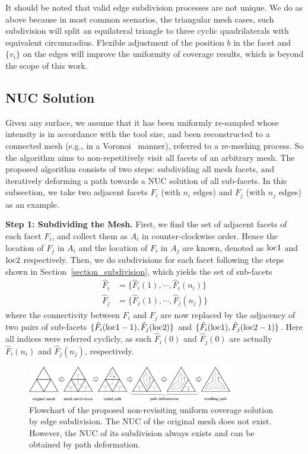 \documentclass[lettersize,journal]{IEEEtran}
\begin{document}
It should be noted that valid edge subdivision processes are not unique. 
We do as above because in most common scenarios, the triangular mesh cases, such subdivision will split an equilateral triangle to three cyclic quadrilaterals with equivalent circumradius. 
Flexible adjustment of the position $b$ in the facet and $\{v_i\}$ on the edges will improve the uniformity of coverage results, which is beyond the scope of this work. 

\subsection{NUC Solution}
Given any surface, we assume that it has been uniformly re-sampled whose intensity is in accordance with the tool size, and been reconstructed to a connected mesh (e.g., in a Voronoi~\cite{choset2000sensor-based} manner), referred to a re-meshing process. 
So the algorithm aims to non-repetitively visit all facets of an arbitrary mesh. 
The proposed algorithm consists of two steps: subdividing all mesh facets, and iteratively deforming a path towards a NUC solution of all sub-facets.
In this subsection, we take two adjacent facets $F_i$ (with $n_i$ edges) and $F_j$ (with $n_j$ edges) as an example. 

\textbf{Step 1: Subdividing the Mesh. }
First, we find the set of adjacent facets of each facet $F_i$, and collect them as $A_i$ in counter-clockwise order. 
Hence the location of $F_j$ in $A_i$ and the location of $F_i$ in $A_j$ are known, denoted as ${\rm loc1}$ and ${\rm loc2}$ respectively. 
Then, we do subdivisions for each facet following the steps shown in Section~\ref{section_subdivision}, which yields the set of sub-facets
\begin{equation}
\begin{aligned}
\hat{F}_i &= \{\hat{F}_i(1), \cdots, \hat{F}_i(n_i)\}\\
\hat{F}_j &= \{\hat{F}_j(1), \cdots, \hat{F}_j(n_j)\}
\end{aligned}
\end{equation}
where the connectivity between $F_i$ and $F_j$ are now replaced by the adjacency of two pairs of sub-facets $\{\hat{F}_i({\rm loc1} - 1), \hat{F}_j({\rm loc2})\}$ and $\{\hat{F}_i({\rm loc1}), \hat{F}_j({\rm loc2}-1)\}$. 
Here all indices were referred cyclicly, as such $\hat{F}_i(0)$ and $\hat{F}_j(0)$ are actually $\hat{F}_i(n_i)$ and $\hat{F}_j(n_j)$, respectively. 

\begin{figure}[t]
\center
\includegraphics[width=0.8\textwidth]{figures/flowchart}
\caption{Flowchart of the proposed non-revisiting uniform coverage solution by edge subdivision. 
The NUC of the original mesh does not exist. 
However, the NUC of its subdivision always exists and can be obtained by path deformation.  
}\label{fig:flowchart}
\end{figure}
\end{document}
